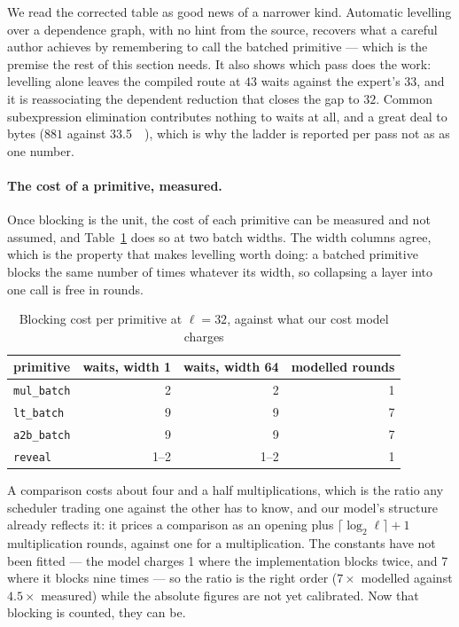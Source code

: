 \documentclass[11pt]{article}
\newcommand{\bt}[1]{\texttt{#1}}
\begin{document}
We read the corrected table as good news of a narrower kind. Automatic levelling over a
dependence graph, with no hint from the source, recovers what a careful author achieves by
remembering to call the batched primitive --- which is the premise the rest of this section needs.
It also shows which pass does the work: levelling alone leaves the compiled route at $\num{43}$
waits against the expert's $\num{33}$, and it is reassociating the dependent reduction that
closes the gap to $\num{32}$. Common subexpression elimination contributes nothing to waits at
all, and a great deal to bytes ($\num{881}$ against \SI{33.5}{\kilo\byte}), which is why the
ladder is reported per pass not as as one number.

\paragraph{The cost of a primitive, measured.}
Once blocking is the unit, the cost of each primitive can be measured and not assumed, and
Table~\ref{tab:waitcost} does so at two batch widths. The width columns agree, which is the
property that makes levelling worth doing: a batched primitive blocks the same number of times
whatever its width, so collapsing a layer into one call is free in rounds.

\begin{table}[htb]
\centering
\small
\begin{tabular}{@{}lrrr@{}}
\toprule
primitive & waits, width 1 & waits, width 64 & modelled rounds \\
\midrule
\bt{mul\_batch} & 2 & 2 & 1 \\
\bt{lt\_batch} & 9 & 9 & 7 \\
\bt{a2b\_batch} & 9 & 9 & 7 \\
\bt{reveal} & 1--2 & 1--2 & 1 \\
\bottomrule
\end{tabular}
\caption{Blocking cost per primitive at $\ell = 32$, against what our cost model charges}
\label{tab:waitcost}
\end{table}

A comparison costs about four and a half multiplications, which is the ratio any scheduler
trading one against the other has to know, and our model's structure already reflects it: it
prices a comparison as an opening plus $\lceil \log_2 \ell \rceil + 1$ multiplication rounds,
against one for a multiplication. The constants have not been fitted --- the model charges 1
where the implementation blocks twice, and 7 where it blocks nine times --- so the ratio is the
right order ($7\times$ modelled against $4.5\times$ measured) while the absolute figures are not
yet calibrated. Now that blocking is counted, they can be.
\end{document}
